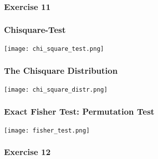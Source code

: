 \documentclass{beamer}\usepackage[]{graphicx}\usepackage[]{color}
\begin{document}
{{{
\begin{frame}
\frametitle{Exercise 11}
\end{frame}


\usebackgroundtemplate{}
\begin{frame}
\frametitle{Chisquare-Test}
\begin{center}
\texttt{[image: chi\_square\_test.png]}
\end{center}
\end{frame}


\usebackgroundtemplate{}
\begin{frame}
\frametitle{The Chisquare Distribution}
\begin{center}
\texttt{[image: chi\_square\_distr.png]}
\end{center}
\end{frame}


\usebackgroundtemplate{}
\begin{frame}
\frametitle{Exact Fisher Test: Permutation Test}
\begin{center}
\texttt{[image: fisher\_test.png]}
\end{center}
\end{frame}


\begin{frame}
\frametitle{Exercise 12}
\end{frame}


}}}
\end{document}
